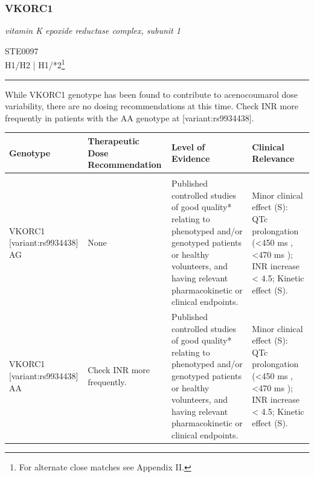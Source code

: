 \documentclass{report}
\begin{document}
      \normalsize\subsubsection{ VKORC1 }
     \textit{ vitamin K epoxide reductase complex, subunit 1 } \begin{flushright} \textsc{ STE0097 \\ H1/H2  | H1/*2\footnote{For alternate close matches see Appendix II.} }\end{flushright}
      \hrule \vspace{6pt}
      While VKORC1 genotype has been found to contribute to acenocoumarol dose variability, there are no dosing recommendations at this time. Check INR more frequently in patients with the AA genotype at [variant:rs9934438]. \newline
      \scriptsize
      
      \begin{tabularx}{\textwidth}{ XXXX }
      \textbf{ Genotype }&\textbf{ Therapeutic Dose Recommendation }&\textbf{ Level of Evidence }&\textbf{ Clinical Relevance } \\ \hline \\  VKORC1 [variant:rs9934438] AG & None & Published controlled studies of good quality* relating to phenotyped and/or genotyped patients or healthy volunteers, and having relevant pharmacokinetic or clinical endpoints. & Minor clinical effect (S): QTc prolongation (<450 ms , <470 ms ); INR increase < 4.5; Kinetic effect (S).  \\  VKORC1 [variant:rs9934438] AA & Check INR more frequently. & Published controlled studies of good quality* relating to phenotyped and/or genotyped patients or healthy volunteers, and having relevant pharmacokinetic or clinical endpoints. & Minor clinical effect (S): QTc prolongation (<450 ms , <470 ms ); INR increase < 4.5; Kinetic effect (S).  \\ 
      \end{tabularx}
      
      \normalsize
\end{document}
